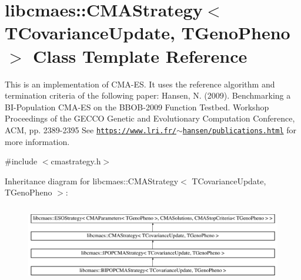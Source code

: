 \hypertarget{classlibcmaes_1_1CMAStrategy}{\section{libcmaes\-:\-:C\-M\-A\-Strategy$<$ T\-Covariance\-Update, T\-Geno\-Pheno $>$ Class Template Reference}
\label{classlibcmaes_1_1CMAStrategy}
}


This is an implementation of C\-M\-A-\/\-E\-S. It uses the reference algorithm and termination criteria of the following paper\-: Hansen, N. (2009). Benchmarking a B\-I-\/\-Population C\-M\-A-\/\-E\-S on the B\-B\-O\-B-\/2009 Function Testbed. Workshop Proceedings of the G\-E\-C\-C\-O Genetic and Evolutionary Computation Conference, A\-C\-M, pp. 2389-\/2395 See \href{https://www.lri.fr/~hansen/publications.html}{\tt https\-://www.\-lri.\-fr/$\sim$hansen/publications.\-html} for more information.  




{\ttfamily \#include $<$cmastrategy.\-h$>$}

Inheritance diagram for libcmaes\-:\-:C\-M\-A\-Strategy$<$ T\-Covariance\-Update, T\-Geno\-Pheno $>$\-:\begin{figure}[H]
\begin{center}
\leavevmode
\includegraphics[height=3.430321cm]{classlibcmaes_1_1CMAStrategy}
\end{center}
\end{figure}
